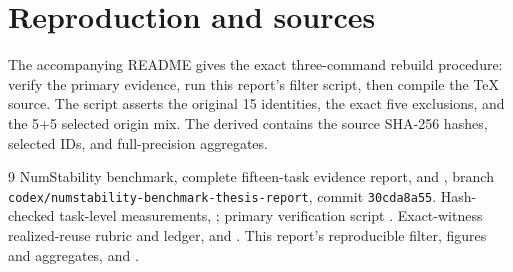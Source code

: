 \documentclass[10pt,a4paper]{article}
\begin{document}
\section*{Reproduction and sources}
The accompanying README gives the exact three-command rebuild procedure:
verify the primary evidence, run this report's filter script, then compile
the TeX source. The script asserts the original 15 identities, the exact
five exclusions, and the 5+5 selected origin mix. The derived
 contains the source SHA-256 hashes, selected
IDs, and full-precision aggregates.

\begin{thebibliography}{9}\small
{} NumStability benchmark, complete fifteen-task evidence
report,  and
, branch
\texttt{codex/numstability-benchmark-thesis-report}, commit
\texttt{30cda8a55}.
 Hash-checked task-level measurements,
; primary
verification script .
 Exact-witness realized-reuse rubric and ledger,
 and
.
 This report's reproducible filter, figures and aggregates,
 and
.
\end{thebibliography}
\end{document}
